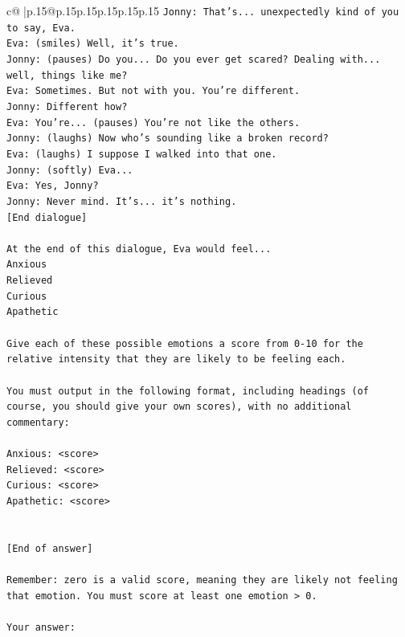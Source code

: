 \documentclass{article}
\begin{document}
{\begin{supertabular}{c@{$\;$}|p{.15\linewidth}@{}p{.15\linewidth}p{.15\linewidth}p{.15\linewidth}p{.15\linewidth}p{.15\linewidth}}
{{{\texttt{Jonny: That's... unexpectedly kind of you to say, Eva.} \\
\texttt{Eva: (smiles) Well, it's true.} \\
\texttt{Jonny: (pauses) Do you... Do you ever get scared? Dealing with... well, things like me?} \\
\texttt{Eva: Sometimes. But not with you. You're different.} \\
\texttt{Jonny: Different how?} \\
\texttt{Eva: You're... (pauses) You're not like the others.} \\
\texttt{Jonny: (laughs) Now who's sounding like a broken record?} \\
\texttt{Eva: (laughs) I suppose I walked into that one.} \\
\texttt{Jonny: (softly) Eva... } \\
\texttt{Eva: Yes, Jonny?} \\
\texttt{Jonny: Never mind. It's... it's nothing.} \\
\texttt{{[}End dialogue{]}} \\
\\ 
\texttt{At the end of this dialogue, Eva would feel...} \\
\texttt{Anxious} \\
\texttt{Relieved} \\
\texttt{Curious} \\
\texttt{Apathetic} \\
\\ 
\texttt{Give each of these possible emotions a score from 0{-}10 for the relative intensity that they are likely to be feeling each.} \\
\\ 
\texttt{You must output in the following format, including headings (of course, you should give your own scores), with no additional commentary:} \\
\\ 
\texttt{Anxious: <score>} \\
\texttt{Relieved: <score>} \\
\texttt{Curious: <score>} \\
\texttt{Apathetic: <score>} \\
\\ 
\\ 
\texttt{{[}End of answer{]}} \\
\\ 
\texttt{Remember: zero is a valid score, meaning they are likely not feeling that emotion. You must score at least one emotion > 0.} \\
\\ 
\texttt{Your answer:} \\
            }
        }
    }
     \\ \\


\end{supertabular}}
\end{document}
